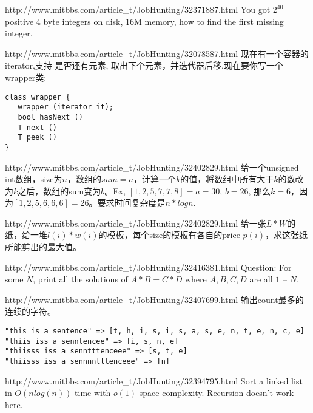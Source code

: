 \documentclass[a4paper]{article}
\newcommand{\ilcode}[1]{
	\framebox[\width]{\texttt{#1}}
}
\begin{document}
\begin{CJK}{UTF8}{gbsn}
\begin{enumerate}
\begin{Q}[Apple]{http://www.mitbbs.com/article_t/JobHunting/32371887.html}
You got $2^{40}$ positive 4 byte integers on disk, 16M memory, how to find the first missing integer.
\end{Q}

\begin{Q}[Google]{http://www.mitbbs.com/article_t/JobHunting/32078587.html}
现在有一个容器的iterator,支持\ilcode{bool hasNext ()}是否还有元素,\ilcode{T next ()}取出下个元素，并迭代器后移.现在要你写一个wrapper类:

\begin{lstlisting}
class wrapper {
   wrapper (iterator it);
   bool hasNext ()
   T next ()
   T peek ()
}
\end{lstlisting}
\end{Q}

\begin{Q}{http://www.mitbbs.com/article_t/JobHunting/32402829.html}
给一个unsigned int数组，size为$n$，数组的$sum = a$，计算一个$k$的值，将数组中所有大于$k$的数改为$k$之后，数组的sum变为$b$。Ex, $[1,2,5,7,7,8] = a = 30$, $b = 26$, 那么$k = 6$，因为$[1,2,5,6,6,6] = 26$。要求时间复杂度是$n*logn$.
\end{Q}

\begin{Q}{http://www.mitbbs.com/article_t/JobHunting/32402829.html}
给一张$L*W$的纸，给一堆$l(i)* w(i)$的模板，每个size的模板有各自的price $p(i)$，求这张纸所能剪出的最大值。
\end{Q}

\begin{Q}[Facebook]{http://www.mitbbs.com/article_t/JobHunting/32416381.html}
Question: For some $N$, print all the solutions of $A * B = C * D$ where $A, B, C, D$ are all $1$ -- $N$.
\end{Q}

\begin{Q}[Facebook]{http://www.mitbbs.com/article_t/JobHunting/32407699.html}
输出count最多的连续的字符。

\begin{lstlisting}
"this is a sentence" => [t, h, i, s, i, s, a, s, e, n, t, e, n, c, e]
"thiis iss a senntencee" => [i, s, n, e]
"thiisss iss a senntttenceee" => [s, t, e]
"thiisss iss a sennnntttenceee" => [n]
\end{lstlisting}
\end{Q}

\begin{Q}[Facebook]{http://www.mitbbs.com/article_t/JobHunting/32394795.html}
Sort a linked list in $O(nlog(n))$ time with $o(1)$ space complexity. Recursion doesn't work here.
\end{Q}


\end{enumerate}
\end{CJK}
\end{document}
